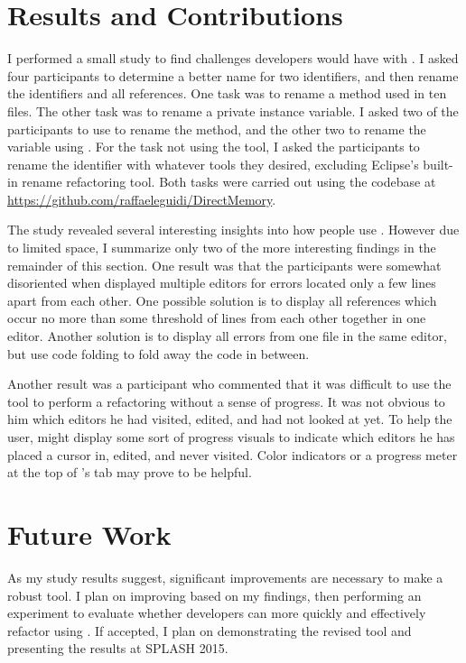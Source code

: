 \documentclass{sigplanconf}
\begin{document}
\section{Results and Contributions}
I performed a small study to find challenges developers would have with
\pname{}. I asked four participants to determine a better
name for two identifiers, and then rename the identifiers and all references.
One task was to rename a method used in ten files.
The other task was to rename a private instance variable. I asked two of the
participants to use \pname{} to rename the method, and the other two
to rename the variable using \pname{}.
For the task not using the tool, I asked the participants to rename the
identifier with whatever tools they desired, excluding Eclipse's built-in rename
refactoring tool. Both tasks were carried out using the codebase at
\url{https://github.com/raffaeleguidi/DirectMemory}.

The study revealed several interesting insights into how people use \pname{}.
However due to limited space, I summarize only two of the more interesting
findings in the remainder of this section.
One result was that the participants were somewhat disoriented when \pname{}
displayed multiple editors for errors located only a few lines apart from each
other. One possible solution is to display all references which occur no more
than some threshold of lines from each other together in one editor. Another
solution is to display all errors from one file in the same editor, but use code
folding to fold away the code in between.

Another result was a participant who commented that it was difficult to use the
tool to perform a refactoring without a sense of progress. It was not obvious to
him which editors he had visited, edited, and had not looked at yet.  To help
the user, \pname{} might display some sort of progress visuals to indicate which
editors he has placed a cursor in, edited, and never visited.  Color indicators
or a progress meter at the top of \pname{}'s tab may prove to be helpful.

\section{Future Work}
As my study results suggest, significant improvements are necessary to make
\pname{} a robust tool. I plan on improving \pname{} based on my findings, then
performing an experiment to evaluate whether developers can more quickly and
effectively refactor using \pname{}. If accepted, I plan on demonstrating the
revised tool and presenting the results at SPLASH 2015.
\end{document}
